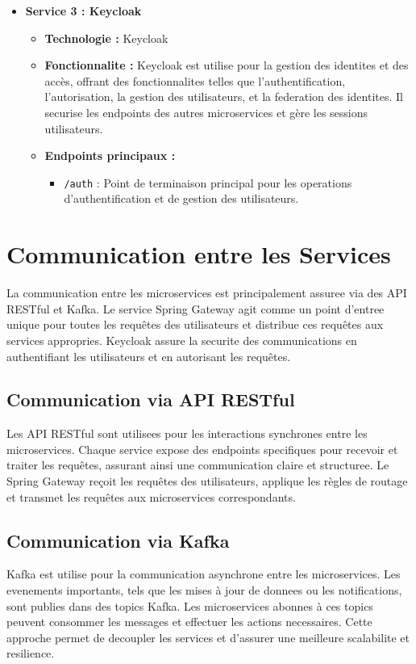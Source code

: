 \documentclass[a4paper, 11pt, openany]{report}
\begin{document}
\begin{itemize}
    \item \textbf{Service 3 : Keycloak}
    \begin{itemize}
        \item \textbf{Technologie :} Keycloak
        \item \textbf{Fonctionnalite :} Keycloak est utilise pour la gestion des identites et des accès, offrant des fonctionnalites telles que l'authentification, l'autorisation, la gestion des utilisateurs, et la federation des identites. Il securise les endpoints des autres microservices et gère les sessions utilisateurs.
        \item \textbf{Endpoints principaux :}
        \begin{itemize}
            \item \texttt{/auth} : Point de terminaison principal pour les operations d'authentification et de gestion des utilisateurs.
        \end{itemize}
    \end{itemize}
\end{itemize}







\section{Communication entre les Services}
La communication entre les microservices est principalement assuree via des API RESTful et Kafka. Le service Spring Gateway agit comme un point d'entree unique pour toutes les requêtes des utilisateurs et distribue ces requêtes aux services appropries. Keycloak assure la securite des communications en authentifiant les utilisateurs et en autorisant les requêtes.

\subsection{Communication via API RESTful}
Les API RESTful sont utilisees pour les interactions synchrones entre les microservices. Chaque service expose des endpoints specifiques pour recevoir et traiter les requêtes, assurant ainsi une communication claire et structuree. Le Spring Gateway reçoit les requêtes des utilisateurs, applique les règles de routage et transmet les requêtes aux microservices correspondants.

\subsection{Communication via Kafka}
Kafka est utilise pour la communication asynchrone entre les microservices. Les evenements importants, tels que les mises à jour de donnees ou les notifications, sont publies dans des topics Kafka. Les microservices abonnes à ces topics peuvent consommer les messages et effectuer les actions necessaires. Cette approche permet de decoupler les services et d'assurer une meilleure scalabilite et resilience.
\end{document}
